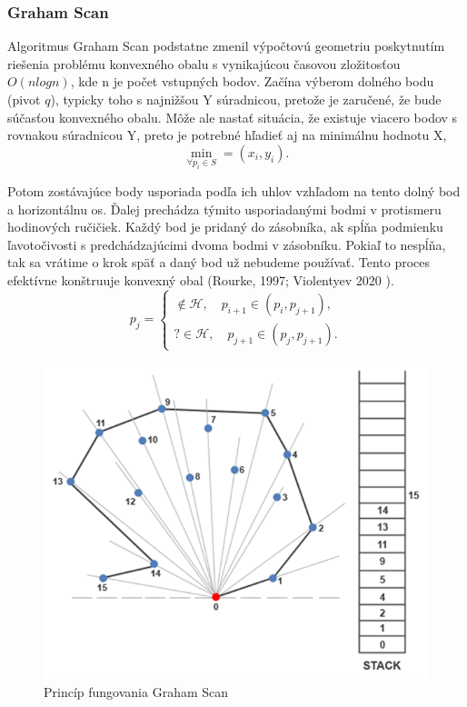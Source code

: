 \documentclass[12pt]{article}
\begin{document}
\subsubsection*{Graham Scan}
Algoritmus Graham Scan podstatne zmenil výpočtovú geometriu poskytnutím riešenia problému konvexného obalu s vynikajúcou časovou zložitosťou \(O(n log n)\), kde n je počet vstupných bodov. Začína výberom dolného bodu (pivot \(q\)), typicky toho s najnižšou Y súradnicou, pretože je zaručené, že bude súčasťou konvexného obalu. Môže ale nastať situácia, že existuje viacero bodov s rovnakou súradnicou Y, preto je potrebné hľadieť aj na minimálnu hodnotu X, $$\min\limits_{\forall p_i \in S} = (x_i,y_i).$$
\par Potom zostávajúce body usporiada podľa ich uhlov vzhľadom na tento dolný bod a horizontálnu os. Ďalej prechádza týmito usporiadanými bodmi v protismeru hodinových ručičiek. Každý bod je pridaný do zásobníka, ak spĺňa podmienku ľavotočivosti s predchádzajúcimi dvoma bodmi v zásobníku. Pokiaľ to nespĺňa, tak sa vrátime o krok späť a daný bod už nebudeme používať. Tento proces efektívne konštruuje konvexný obal (Rourke, 1997; Violentyev 2020 ).  \\
\begin{equation}\nonumber
    p_j=
    \begin{cases}
    \notin \mathcal{H}, \quad p_{i+1} \in (p_i, p_{j+1}), \\
    ? \in \mathcal{H}, \quad p_{j+1} \in (p_j, p_{j+1}).
    \end{cases}
\end{equation}


\begin{figure}[h]
    \centering
    \includegraphics[width=0.6\linewidth]{latex/image/graham.png}
    \caption{Princíp fungovania Graham Scan}
    \label{fig:enter-label}
\end{figure}
\end{document}
